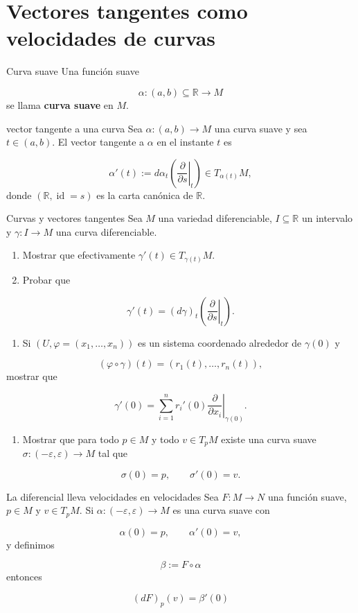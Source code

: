 \section{Vectores tangentes como velocidades de curvas}
\begin{bookdefinition}{Curva suave}
Una función suave

\[
\alpha:(a,b)\subseteq\mathbb R\to M
\]
se llama \textbf{curva suave} en $M$.

\end{bookdefinition}
\begin{bookdefinition}{vector tangente a una curva}
Sea $\alpha:(a,b)\to M$ una curva suave y sea $t\in(a,b)$. El vector tangente a $\alpha$ en el instante $t$ es

\[
\alpha'(t):=d\alpha_t\left(\left.\frac{\partial}{\partial s}\right|_t\right)\in T_{\alpha(t)}M,
\]
donde $(\mathbb R,\operatorname{id}=s)$ es la carta canónica de $\mathbb R$.

\end{bookdefinition}
\label{blk:0106aa}
\begin{bookexercise}{Curvas y vectores tangentes}
Sea $M$ una variedad diferenciable, $I\subseteq\mathbb R$ un intervalo y $\gamma:I\to M$ una curva diferenciable.

\begin{enumerate}
\item Mostrar que efectivamente $\gamma'(t)\in T_{\gamma(t)}M$.
\item Probar que
\end{enumerate}
\[
\gamma'(t)=(d\gamma)_t\left(\left.\frac{\partial}{\partial s}\right|_t\right).
\]
\begin{enumerate}[start=3]
\item Si $(U,\varphi=(x_1,\dots,x_n))$ es un sistema coordenado alrededor de $\gamma(0)$ y
\end{enumerate}
\[
(\varphi\circ\gamma)(t)=(r_1(t),\dots,r_n(t)),
\]
mostrar que

\[
\gamma'(0)=\sum_{i=1}^n r_i'(0)\left.\frac{\partial}{\partial x_i}\right|_{\gamma(0)}.
\]
\begin{enumerate}[start=4]
\item Mostrar que para todo $p\in M$ y todo $v\in T_pM$ existe una curva suave $\sigma:(-\varepsilon,\varepsilon)\to M$ tal que
\end{enumerate}
\[
\sigma(0)=p,\qquad \sigma'(0)=v.
\]
\end{bookexercise}
\begin{bookcorollary}{La diferencial lleva velocidades en velocidades}
Sea $F:M\to N$ una función suave, $p\in M$ y $v\in T_pM$. Si $\alpha:(-\varepsilon,\varepsilon)\to M$ es una curva suave con

\[
\alpha(0)=p,\qquad \alpha'(0)=v,
\]
y definimos

\[
\beta:=F\circ\alpha
\]
entonces

\[
(dF)_p(v)=\beta'(0)
\]
\end{bookcorollary}
